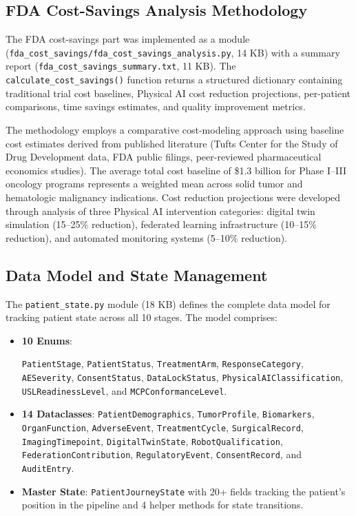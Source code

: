 \subsection{FDA Cost-Savings Analysis Methodology}

The FDA cost-savings part was implemented as a module (\texttt{fda\_cost\_savings/fda\_cost\_savings\_analysis.py}, 14 KB) with a summary report (\texttt{fda\_cost\_savings\_summary.txt}, 11 KB). The \texttt{calculate\_cost\_savings()} function returns a structured dictionary containing traditional trial cost baselines, Physical AI cost reduction projections, per-patient comparisons, time savings estimates, and quality improvement metrics.

The methodology employs a comparative cost-modeling approach using baseline cost estimates derived from published literature (Tufts Center for the Study of Drug Development data, FDA public filings, peer-reviewed pharmaceutical economics studies). The average total cost baseline of \$1.3 billion for Phase I--III oncology programs represents a weighted mean across solid tumor and hematologic malignancy indications. Cost reduction projections were developed through analysis of three Physical AI intervention categories: digital twin simulation (15--25\% reduction), federated learning infrastructure (10--15\% reduction), and automated monitoring systems (5--10\% reduction).

\subsection{Data Model and State Management}

The \texttt{patient\_state.py} module (18 KB) defines the complete data model for tracking patient state across all 10 stages. The model comprises:

\begin{itemize}[leftmargin=*]
\item \textbf{10 Enums}: \raggedright \arraybackslash \texttt{PatientStage}, \texttt{PatientStatus}, \texttt{TreatmentArm}, \texttt{ResponseCategory}, \texttt{AESeverity}, \texttt{ConsentStatus}, \texttt{DataLockStatus}, \texttt{PhysicalAIClassification}, \texttt{USLReadinessLevel}, and \texttt{MCPConformanceLevel}.

\item \textbf{14 Dataclasses}: \texttt{PatientDemographics}, \texttt{TumorProfile}, \texttt{Biomarkers}, \texttt{OrganFunction}, \texttt{AdverseEvent}, \texttt{TreatmentCycle}, \texttt{SurgicalRecord}, \texttt{ImagingTimepoint}, \texttt{DigitalTwinState}, \texttt{RobotQualification}, \texttt{FederationContribution}, \texttt{RegulatoryEvent}, \texttt{ConsentRecord}, and \texttt{AuditEntry}.

\item \textbf{Master State}: \texttt{PatientJourneyState} with 20+ fields tracking the patient's position in the pipeline and 4 helper methods for state transitions.
\end{itemize}

